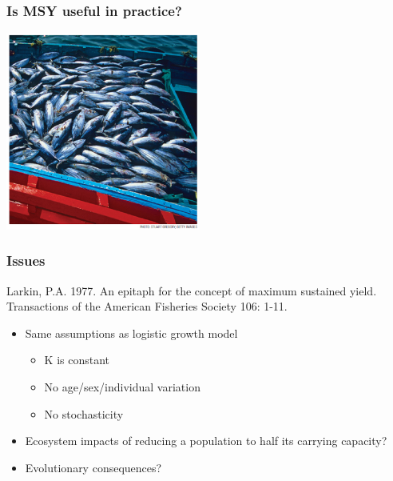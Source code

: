\documentclass[color=usenames,dvipsnames]{beamer}\usepackage[]{graphicx}\usepackage[]{color}
\begin{document}





\begin{frame}
  \frametitle{Is MSY useful in practice?}
  \begin{center}
 \includegraphics[height=6.5cm,keepaspectratio]{figs/tuna}
  \end{center}
\end{frame}




\begin{frame}
  \frametitle{Issues}
  {\flushleft Larkin, P.A. 1977. An epitaph for the concept of maximum
    sustained yield. Transactions of the American Fisheries Society 106: 1-11. \par}
  \pause
  \begin{itemize}%
    \item Same assumptions as logistic growth model
      \begin{itemize}
        \item<3-> K is constant
        \item<3-> No age/sex/individual variation
        \item<3-> No stochasticity
      \end{itemize}
    \item<4-> Ecosystem impacts of reducing a population
      to half its carrying capacity?
    \item<5-> Evolutionary consequences?
  \end{itemize}
\end{frame}
\end{document}
